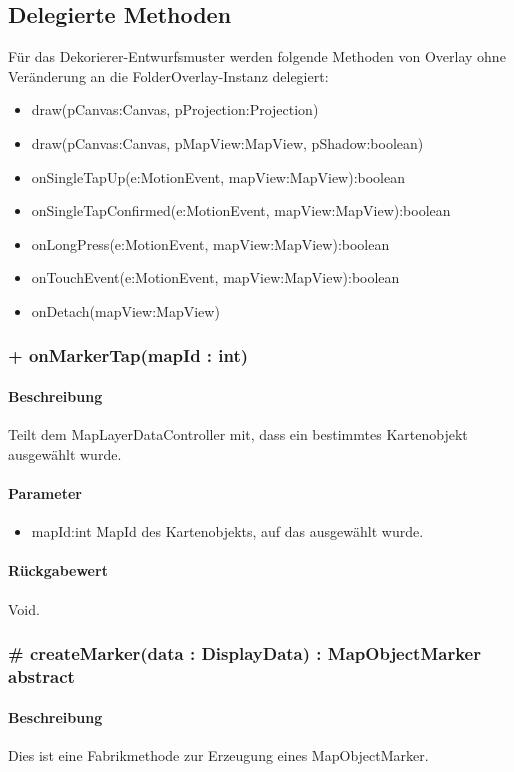 \subsection{Delegierte Methoden}
Für das Dekorierer-Entwurfsmuster werden folgende Methoden von Overlay ohne Veränderung 
an die FolderOverlay-Instanz delegiert:
\begin{itemize}
    \item draw(pCanvas:Canvas, pProjection:Projection)
    \item draw(pCanvas:Canvas, pMapView:MapView, pShadow:boolean)
    \item onSingleTapUp(e:MotionEvent, mapView:MapView):boolean
    \item onSingleTapConfirmed(e:MotionEvent, mapView:MapView):boolean
    \item onLongPress(e:MotionEvent, mapView:MapView):boolean
    \item onTouchEvent(e:MotionEvent, mapView:MapView):boolean
    \item onDetach(mapView:MapView)
\end{itemize}

\subsubsection{+ onMarkerTap(mapId : int)}%
\paragraph*{Beschreibung}
Teilt dem MapLayerDataController mit, dass ein bestimmtes Kartenobjekt ausgewählt wurde.
\paragraph*{Parameter}
\begin{itemize}
    \item mapId:int MapId des Kartenobjekts, auf das ausgewählt wurde.
\end{itemize}
\paragraph*{Rückgabewert}
Void.

\subsubsection{# createMarker(data : DisplayData) : MapObjectMarker {abstract}}%
\paragraph*{Beschreibung}
Dies ist eine Fabrikmethode zur Erzeugung eines MapObjectMarker.

